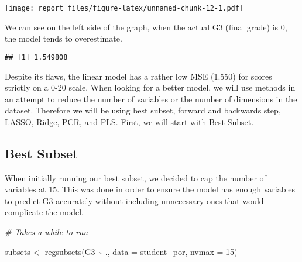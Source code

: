 \documentclass[
]{article}
\newenvironment{Shaded}{\begin{snugshade}}{\end{snugshade}}
\newcommand{\AttributeTok}[1]{\textcolor[rgb]{0.77,0.63,0.00}{#1}}
\newcommand{\CommentTok}[1]{\textcolor[rgb]{0.56,0.35,0.01}{\textit{#1}}}
\newcommand{\DecValTok}[1]{\textcolor[rgb]{0.00,0.00,0.81}{#1}}
\newcommand{\FunctionTok}[1]{\textcolor[rgb]{0.00,0.00,0.00}{#1}}
\newcommand{\NormalTok}[1]{#1}
\newcommand{\OtherTok}[1]{\textcolor[rgb]{0.56,0.35,0.01}{#1}}
\newcommand{\SpecialCharTok}[1]{\textcolor[rgb]{0.00,0.00,0.00}{#1}}
\begin{document}
\texttt{[image: report\_files/figure-latex/unnamed-chunk-12-1.pdf]}

We can see on the left side of the graph, when the actual G3 (final
grade) is 0, the model tends to overestimate.

\begin{Shaded}
\end{Shaded}

\begin{verbatim}
## [1] 1.549808
\end{verbatim}

Despite its flaws, the linear model has a rather low MSE (1.550) for
scores strictly on a 0-20 scale. When looking for a better model, we
will use methods in an attempt to reduce the number of variables or the
number of dimensions in the dataset. Therefore we will be using best
subset, forward and backwards step, LASSO, Ridge, PCR, and PLS. First,
we will start with Best Subset.

\hypertarget{best-subset}{%
\subsection{Best Subset}\label{best-subset}}

When initially running our best subset, we decided to cap the number of
variables at 15. This was done in order to ensure the model has enough
variables to predict G3 accurately without including unnecessary ones
that would complicate the model.

\begin{Shaded}
\begin{Highlighting}[]
\CommentTok{\# Takes a while to run}

\NormalTok{subsets }\OtherTok{\textless{}{-}} \FunctionTok{regsubsets}\NormalTok{(G3 }\SpecialCharTok{\textasciitilde{}}\NormalTok{ ., }\AttributeTok{data =}\NormalTok{ student\_por, }\AttributeTok{nvmax =} \DecValTok{15}\NormalTok{)}
\end{Highlighting}
\end{Shaded}

\begin{Shaded}
\end{Shaded}
\end{document}
